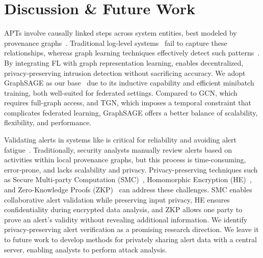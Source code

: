 \section{Discussion \& Future Work}
\label{sec:discussion}



APTs involve causally linked steps across system entities, best modeled by provenance graphs~\cite{inam2023sok}. Traditional log-level systems~\cite{deeplog2017,liu2019log2vec,xia2019loggan} fail to capture these relationships, whereas graph learning techniques effectively detect such patterns~\cite{flash2024,cheng2023kairos,jia2023magic}. By integrating FL with graph representation learning, \Sys enables decentralized, privacy-preserving intrusion detection without sacrificing accuracy. We adopt GraphSAGE as our base \gnnshort\ due to its inductive capability and efficient minibatch training, both well-suited for federated settings. Compared to GCN, which requires full-graph access, and TGN, which imposes a temporal constraint that complicates federated learning, GraphSAGE offers a better balance of scalability, flexibility, and performance.


 Validating alerts in systems like \Sys is critical for reliability and avoiding alert fatigue~\cite{nodoze2019}. Traditionally, security analysts manually review alerts based on activities within local provenance graphs, but this process is time-consuming, error-prone, and lacks scalability and privacy. Privacy-preserving techniques such as Secure Multi-party Computation (SMC)~\cite{goldreich1998secure}, Homomorphic Encryption (HE)~\cite{yi2014homomorphic}, and Zero-Knowledge Proofs (ZKP)~\cite{fiege1987zero} can address these challenges. SMC enables collaborative alert validation while preserving input privacy, HE ensures confidentiality during encrypted data analysis, and ZKP allows one party to prove an alert's validity without revealing additional information. We identify privacy-preserving alert verification as a promising research direction. We leave it to future work to develop methods for privately sharing alert data with a central server, enabling analysts to perform attack analysis.

